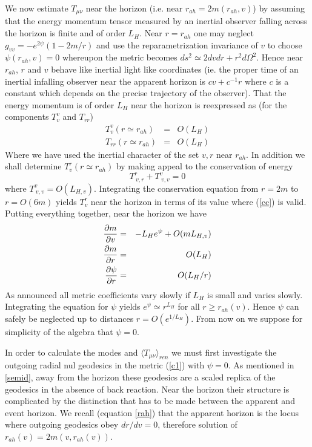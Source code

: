 \documentclass[12pt,oneside]{report}
\begin{document}
We now estimate $T_{\mu\nu}$ near the horizon (i.e. near $r_{ah}=2m(r_{ah},v)$)
by assuming that the
energy momentum tensor measured by an inertial observer falling across the
horizon is finite and of order $L_H$. 
Near $r=r_{ah}$ one may neglect $g_{vv} = - e^{2 \psi} (1 - 2 m/r)$ and use
the reparametrization invariance of $v$ to choose $\psi(r_{ah},v)=0$
whereupon the metric becomes $ds^2 \simeq 2 dv dr + r^2 d \Omega ^2$. Hence
near $r_{ah}$, $r$ and $v$ behave like inertial light like coordinates (ie.
the proper time of an inertial infalling observer near the apparent horizon
is $cv + c^{-1} r$ where $c$ is a constant which depends on the precise
trajectory of the observer). That the energy momentum is of order $L_H$ near
the horizon is reexpressed as (for the components $T^v_v$ and $T_{rr}$)
\begin{eqnarray} T^v_v (r\simeq r_{ah}) &=& O(L_H)\nonumber\\ T_{rr} (r\simeq
r_{ah}) &=& O(L_H)\label{rahT} \end{eqnarray}
Where we have used the inertial character of the set $v,r$ near $r_{ah}$. In
addition we shall determine $T^r_v(r\simeq r_{ah})$ by making appeal to the
conservation of energy
\begin{equation}
T^r_{\ v,r} + T^v_{\ v,v} =0
\label{c8}
\end{equation}
where $T^v_{\ v,v} = O(L_{H,v})$. Integrating the conservation equation
from $r=2m$ to $r=O(6m)$ yields $T^r_v$ near the horizon in terms of its
value where (\ref{cc}) is valid. Putting everything together, near the horizon
we have  \begin{eqnarray}  {\partial m
\over \partial v} &=&-L_H e^\psi + O( m L_{H,v})\nonumber\\
{\partial m \over \partial r} &=&O(L_H)\nonumber\\
{\partial \psi\over \partial r}
&=&O({L_H / r})\label{c12}
\end{eqnarray}
As announced all metric coefficients vary slowly if $L_H$
is small and varies slowly. Integrating the equation for $\psi$ yields $e^\psi
\simeq r^{L_H}$ for all $r\geq r_{ah}(v)$. Hence 
$\psi$ can safely be neglected up to
distances $r = O(e^{1/L_H})$. From now on we suppose for simplicity of the
algebra that $\psi =0$.

In order to calculate the modes and $\langle T_{\mu\nu}\rangle_{ren}$ we must
first investigate the outgoing radial nul geodesics in the metric (\ref{c1})
with $\psi=0$. As mentioned in \ref{semid}, away from the horizon these geodesics
are a scaled replica of the geodesics in the absence of back reaction. Near
the horizon their structure is complicated by the distinction that has to be
made between the apparent and event horizon. We recall (equation \ref{rah}) 
that the
apparent horizon is the locus where outgoing geodesics obey $dr/dv =0$, therefore
solution of  $ r_{ah}(v) = 2 m (v, r_{ah}(v))$.
\end{document}
